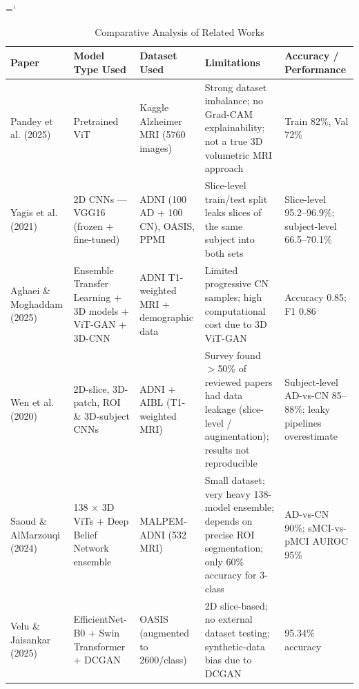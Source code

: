 \begin{sloppypar}
\hyphenchar\font=`\-
\begin{longtable}{|p{2.6cm}|p{2.3cm}|p{2.4cm}|p{3.3cm}|p{2.3cm}|}
\caption{Comparative Analysis of Related Works}\\
\hline
\textbf{Paper} & \textbf{Model Type Used} & \textbf{Dataset Used} & \textbf{Limitations} & \textbf{Accuracy / Performance} \\
\hline
Pandey et al. (2025)~\cite{pandey2025leveraging} & Pretrained ViT & Kaggle Alzheimer MRI (5760 images) & Strong dataset imbalance; no Grad-CAM explainability; not a true 3D volumetric MRI approach & Train 82\%, Val 72\% \\
\hline
Yagis et al. (2021)~\cite{yagis2021effect} & 2D CNNs --- VGG16 (frozen + fine-tuned) & ADNI (100 AD + 100 CN), OASIS, PPMI & Slice-level train/test split leaks slices of the same subject into both sets & Slice-level 95.2--96.9\%; subject-level 66.5--70.1\% \\
\hline
Aghaei \& Moghaddam (2025)~\cite{aghaei2025integrated} & Ensemble Transfer Learning + 3D models + ViT-GAN + 3D-CNN & ADNI T1-weighted MRI + demographic data & Limited progressive CN samples; high computational cost due to 3D ViT-GAN & Accuracy 0.85; F1 0.86 \\
\hline
Wen et al. (2020)~\cite{wen2020convolutional} & 2D-slice, 3D-patch, ROI \& 3D-subject CNNs & ADNI + AIBL (T1-weighted MRI) & Survey found $>$50\% of reviewed papers had data leakage (slice-level / augmentation); results not reproducible & Subject-level AD-vs-CN 85--88\%; leaky pipelines overestimate \\
\hline
Saoud \& AlMarzouqi (2024)~\cite{saoud2024explainable} & 138 $\times$ 3D ViTs + Deep Belief Network ensemble & MALPEM-ADNI (532 MRI) & Small dataset; very heavy 138-model ensemble; depends on precise ROI segmentation; only 60\% accuracy for 3-class & AD-vs-CN 90\%; sMCI-vs-pMCI AUROC 95\% \\
\hline
Velu \& Jaisankar (2025)~\cite{velu2025design} & EfficientNet-B0 + Swin Transformer + DCGAN & OASIS (augmented to 2600/class) & 2D slice-based; no external dataset testing; synthetic-data bias due to DCGAN & 95.34\% accuracy \\
\hline
\end{longtable}
\end{sloppypar}

